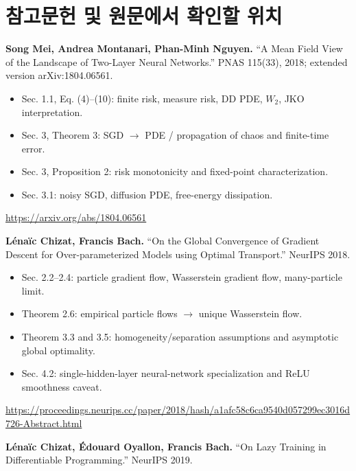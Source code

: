 \documentclass[11pt,a4paper,oneside,openany]{memoir}
\theoremstyle{definition}
\begin{document}
\chapter*{참고문헌 및 원문에서 확인할 위치}

\textbf{Song Mei, Andrea Montanari, Phan-Minh Nguyen.}
``A Mean Field View of the Landscape of Two-Layer Neural Networks.''
PNAS 115(33), 2018; extended version arXiv:1804.06561.

\begin{itemize}
  \item Sec. 1.1, Eq. (4)--(10): finite risk, measure risk, DD PDE, $W_2$, JKO interpretation.
  \item Sec. 3, Theorem 3: SGD $\to$ PDE / propagation of chaos and finite-time error.
  \item Sec. 3, Proposition 2: risk monotonicity and fixed-point characterization.
  \item Sec. 3.1: noisy SGD, diffusion PDE, free-energy dissipation.
\end{itemize}
\url{https://arxiv.org/abs/1804.06561}

\vspace{0.8em}
\textbf{Lénaïc Chizat, Francis Bach.}
``On the Global Convergence of Gradient Descent for Over-parameterized Models using Optimal Transport.''
NeurIPS 2018.

\begin{itemize}
  \item Sec. 2.2--2.4: particle gradient flow, Wasserstein gradient flow, many-particle limit.
  \item Theorem 2.6: empirical particle flows $\to$ unique Wasserstein flow.
  \item Theorem 3.3 and 3.5: homogeneity/separation assumptions and asymptotic global optimality.
  \item Sec. 4.2: single-hidden-layer neural-network specialization and ReLU smoothness caveat.
\end{itemize}
\url{https://proceedings.neurips.cc/paper/2018/hash/a1afc58c6ca9540d057299ec3016d726-Abstract.html}

\vspace{0.8em}
\textbf{Lénaïc Chizat, Édouard Oyallon, Francis Bach.}
``On Lazy Training in Differentiable Programming.'' NeurIPS 2019.
\end{document}
